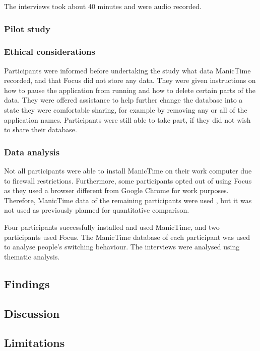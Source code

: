 The interviews took about 40 minutes and were audio recorded.

\subsubsection{Pilot study}


\subsubsection{Ethical considerations}
Participants were informed before undertaking the study what data ManicTime recorded, and that Focus did not store any data. They were given instructions on how to pause the application from running and how to delete certain parts of the data. They were offered assistance to help further change the database into a state they were comfortable sharing, for example by removing any or all of the application names. 
Participants were still able to take part, if they did not wish to share their database.

\subsubsection{Data analysis}
Not all participants were able to install ManicTime on their work computer due to firewall restrictions. Furthermore, some participants opted out of using Focus as they used a browser different from Google Chrome for work purposes. 
Therefore, ManicTime data of the remaining participants were used , but it was not used as previously planned for quantitative comparison.

Four participants successfully installed and used ManicTime, and two participants used Focus. 
The ManicTime database of each participant was used to analyse people's switching behaviour. 
The interviews were analysed using thematic analysis. 

\subsection{Findings}

\subsection{Discussion}

\subsection{Limitations}


